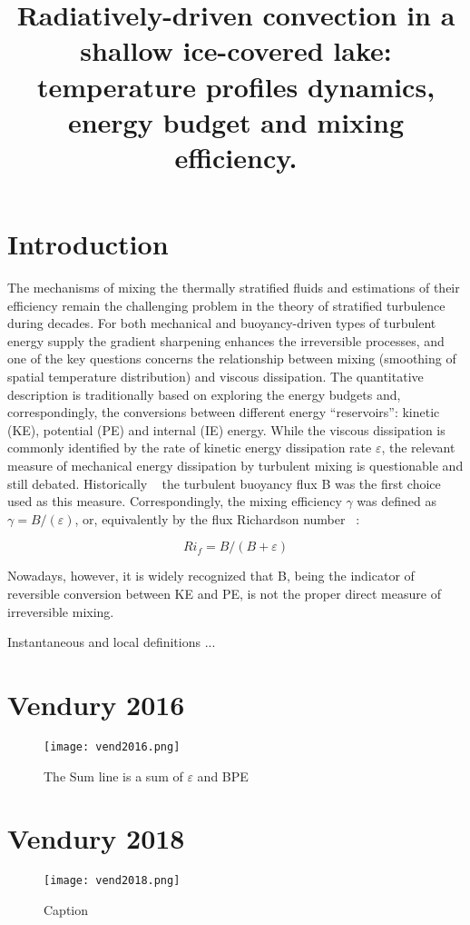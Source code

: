 \documentclass{article}
\title{Radiatively-driven convection in a shallow ice-covered lake: 
temperature profiles dynamics, energy budget and mixing efficiency.
}
\author{}
\begin{document}
\maketitle

\section{Introduction}
The mechanisms of mixing the thermally stratified fluids and estimations of their efficiency remain the challenging problem in the theory of stratified turbulence during decades. For both mechanical and buoyancy-driven types of turbulent energy supply the gradient sharpening enhances the irreversible processes, and one of the key questions concerns the relationship between mixing (smoothing of spatial temperature distribution) and viscous dissipation. The quantitative description is traditionally based on exploring the energy budgets and, correspondingly, the conversions between different energy “reservoirs”: kinetic (KE), potential (PE) and internal (IE) energy. While the viscous dissipation is commonly identified by the rate of kinetic energy dissipation rate $\varepsilon$, the relevant measure of mechanical energy dissipation by turbulent mixing is questionable and still debated. Historically ~\cite{turner_buoyancy_1973,Lorenz1955}
the turbulent buoyancy flux B was the first choice used as this measure. Correspondingly, the  mixing efficiency $\gamma$ was defined as $\gamma = B/(\varepsilon)$, or, equivalently by the flux Richardson number ~\cite{Ivey,Imberger, 1991}:   

\begin{equation}\label{eq:Ri}
Ri_f = B/(B+\varepsilon)
\end{equation}

Nowadays, however, it is widely recognized that B, being the indicator of reversible conversion between KE and PE, is not the proper direct measure of irreversible mixing.   


Instantaneous and local definitions ...

\section{Vendury 2016}

\begin{figure}
    \centering
    \texttt{[image: vend2016.png]}
    \caption{The Sum line is a sum of $\varepsilon$ and BPE}
    \label{fig:my_label}
\end{figure}

\section{Vendury 2018}

\begin{figure}
    \centering
    \texttt{[image: vend2018.png]}
    \caption{Caption}
    \label{fig:vend2018}
\end{figure}
\end{document}
